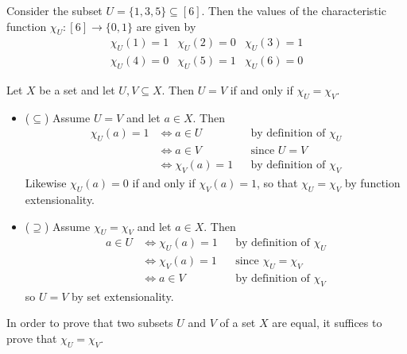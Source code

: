 \begin{example}
Consider the subset $U = \{ 1,3,5 \} \subseteq [6]$. Then the values of the characteristic function $\chi_U : [6] \to \{0,1\}$ are given by
\[ \begin{matrix} \chi_U(1) = 1 & \chi_U(2) = 0 & \chi_U(3) = 1 \\ \chi_U(4) = 0 & \chi_U(5) = 1 & \chi_U(6) = 0 \end{matrix} \]
\end{example}

\begin{theorem}
\label{thmCharacteristicFunctionsCharacteriseSubsets}
Let $X$ be a set and let $U, V \subseteq X$. Then $U=V$ if and only if $\chi_U = \chi_V$.
\end{theorem}

\begin{cproof}
\fixlistskip
\begin{itemize}
\item ($\subseteq$) Assume $U=V$ and let $a \in X$. Then
\begin{align*}
\chi_U(a) = 1 & \Leftrightarrow a \in U && \text{by definition of $\chi_U$} \\
&\Leftrightarrow a \in V && \text{since $U=V$} \\
&\Leftrightarrow \chi_V(a) = 1 && \text{by definition of $\chi_V$}
\end{align*}
Likewise $\chi_U(a) = 0$ if and only if $\chi_V(a) = 1$, so that $\chi_U = \chi_V$ by function extensionality.

\item ($\supseteq$) Assume $\chi_U = \chi_V$ and let $a \in X$. Then
\begin{align*}
a \in U & \Leftrightarrow \chi_U(a) = 1 && \text{by definition of $\chi_U$} \\
&\Leftrightarrow \chi_V(a) = 1 && \text{since $\chi_U = \chi_V$} \\
&\Leftrightarrow a \in V && \text{by definition of $\chi_V$}
\end{align*}
so $U=V$ by set extensionality.
\end{itemize}
\end{cproof}

\begin{strategy}
\label{strSetIdentitiesFromCharacteristicFunctions}
In order to prove that two subsets $U$ and $V$ of a set $X$ are equal, it suffices to prove that $\chi_U = \chi_V$.
\end{strategy}

